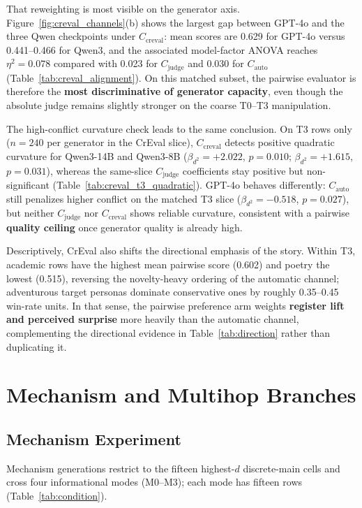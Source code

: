 \documentclass[sigconf,nonacm]{acmart}
\begin{document}
That reweighting is most visible on the generator axis. Figure~\ref{fig:creval_channels}(b) shows the largest gap between GPT-4o and the three Qwen checkpoints under $C_{\mathrm{creval}}$: mean scores are 0.629 for GPT-4o versus 0.441--0.466 for Qwen3, and the associated model-factor ANOVA reaches $\eta^2{=}0.078$ compared with 0.023 for $C_{\mathrm{judge}}$ and 0.030 for $C_{\mathrm{auto}}$ (Table~\ref{tab:creval_alignment}). On this matched subset, the pairwise evaluator is therefore the \textbf{most discriminative of generator capacity}, even though the absolute judge remains slightly stronger on the coarse T0--T3 manipulation.

The high-conflict curvature check leads to the same conclusion. On T3 rows only ($n{=}240$ per generator in the CrEval slice), $C_{\mathrm{creval}}$ detects positive quadratic curvature for Qwen3-14B and Qwen3-8B ($\beta_{d^2}{=}+2.022$, $p{=}0.010$; $\beta_{d^2}{=}+1.615$, $p{=}0.031$), whereas the same-slice $C_{\mathrm{judge}}$ coefficients stay positive but non-significant (Table~\ref{tab:creval_t3_quadratic}). GPT-4o behaves differently: $C_{\mathrm{auto}}$ still penalizes higher conflict on the matched T3 slice ($\beta_{d^2}{=}{-}0.518$, $p{=}0.027$), but neither $C_{\mathrm{judge}}$ nor $C_{\mathrm{creval}}$ shows reliable curvature, consistent with a pairwise \textbf{quality ceiling} once generator quality is already high.

Descriptively, CrEval also shifts the directional emphasis of the story. Within T3, academic rows have the highest mean pairwise score (0.602) and poetry the lowest (0.515), reversing the novelty-heavy ordering of the automatic channel; adventurous target personas dominate conservative ones by roughly 0.35--0.45 win-rate units. In that sense, the pairwise preference arm weights \textbf{register lift and perceived surprise} more heavily than the automatic channel, complementing the directional evidence in Table~\ref{tab:direction} rather than duplicating it.

\section{Mechanism and Multihop Branches}

\subsection{Mechanism Experiment}

Mechanism generations restrict to the fifteen highest-$d$ discrete-main cells and cross four informational modes (M0--M3); each mode has fifteen rows (Table~\ref{tab:condition}).
\end{document}
